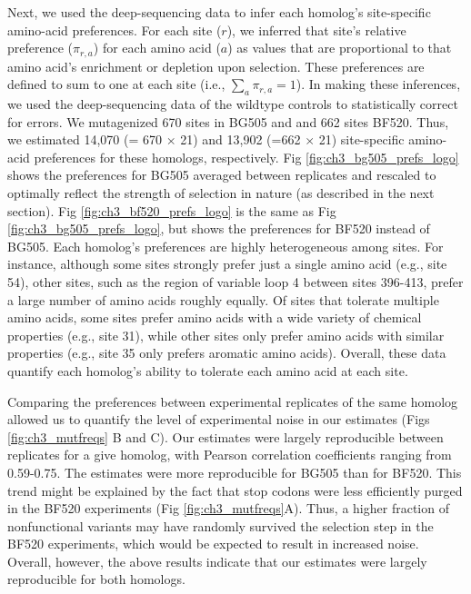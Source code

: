 \documentclass[9pt,lineno]{elife}
\begin{document}
Next, we used the deep-sequencing data to infer each homolog's site-specific amino-acid preferences.
For each site ($r$), we inferred that site's relative preference ($\pi_{r,a}$) for each amino acid ($a$) as values that are proportional to that amino acid's enrichment or depletion upon selection.
These preferences are defined to sum to one at each site (i.e., $\sum_{a} \pi_{r,a} = 1$).
In making these inferences, we used the deep-sequencing data of the wildtype controls to statistically correct for errors.
We mutagenized 670 sites in BG505 and and 662 sites BF520.
Thus, we estimated 14,070 (= 670 $\times$ 21) and 13,902 (=662 $\times$ 21) site-specific amino-acid preferences for these homologs, respectively.
Fig \ref{fig:ch3_bg505_prefs_logo} shows the preferences for BG505 averaged between replicates and rescaled to optimally reflect the strength of selection in nature (as described in the next section).
Fig \ref{fig:ch3_bf520_prefs_logo} is the same as Fig \ref{fig:ch3_bg505_prefs_logo}, but shows the preferences for BF520 instead of BG505.
Each homolog's preferences are highly heterogeneous among sites.
For instance, although some sites strongly prefer just a single amino acid (e.g., site 54), other sites, such as the region of variable loop 4 between sites 396-413, prefer a large number of amino acids roughly equally.
Of sites that tolerate multiple amino acids, some sites prefer amino acids with a wide variety of chemical properties (e.g., site 31), while other sites only prefer amino acids with similar properties (e.g., site 35 only prefers aromatic amino acids).
Overall, these data quantify each homolog's ability to tolerate each amino acid at each site.

Comparing the preferences between experimental replicates of the same homolog allowed us to quantify the level of experimental noise in our estimates (Figs \ref{fig:ch3_mutfreqs} B and C).
Our estimates were largely reproducible between replicates for a give homolog, with Pearson correlation coefficients ranging from 0.59-0.75.
The estimates were more reproducible for BG505 than for BF520.
This trend might be explained by the fact that stop codons were less efficiently purged in the BF520 experiments (Fig \ref{fig:ch3_mutfreqs}A).
Thus, a higher fraction of nonfunctional variants may have randomly survived the selection step in the BF520 experiments, which would be expected to result in increased noise.
Overall, however, the above results indicate that our estimates were largely reproducible for both homologs.
\end{document}

